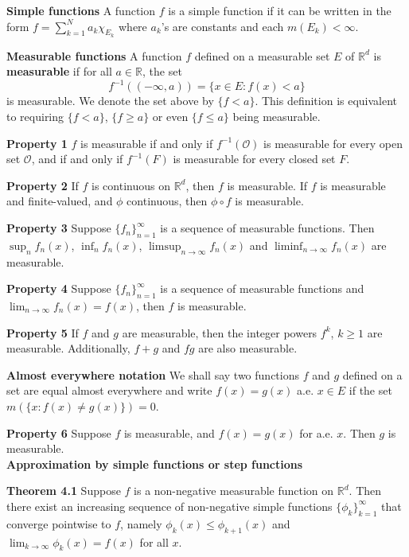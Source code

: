 \documentclass[6pt,landscape]{article}
\begin{document}
\begin{multicols*}{3}
\textbf{Simple functions} A function $f$ is a simple function if it can be written in the form $f = \sum_{k=1}^N a_k\chi_{E_k}$ where $a_k$'s are constants and each $m(E_k)<\infty$.

\textbf{Measurable functions} A function $f$ defined on a measurable set $E$ of $\mathbb{R}^d$ is \textbf{measurable} if for all $a\in\mathbb{R}$, the set
\[ f^{-1}((-\infty,a)) = \{x\in E: f(x) < a\} \]
is measurable. We denote the set above by $\{f < a\}$. This definition is equivalent to requiring $\{f < a\}$, $\{f\geq a\}$ or even $\{f\leq a\}$ being measurable.

\textbf{Property 1} $f$ is measurable if and only if $f^{-1}(\mathcal{O})$ is measurable for every open set $\mathcal{O}$, and if and only if $f^{-1}(F)$ is measurable for every closed
set $F$.

\textbf{Property 2} If $f$ is continuous on $\mathbb{R}^d$, then $f$ is measurable. If $f$ is measurable and finite-valued, and $\phi$ continuous, then $\phi\circ f$ is measurable.

\textbf{Property 3} Suppose $\{f_n\}_{n=1}^{\infty}$ is a sequence of measurable functions. Then $\sup_n f_n(x)$, $\inf_n f_n(x)$, $\limsup_{n\to\infty} f_n(x)$ and
$\liminf_{n\to\infty} f_n(x)$ are measurable.

\textbf{Property 4} Suppose $\{f_n\}_{n=1}^{\infty}$ is a sequence of measurable functions and $\lim_{n\to\infty} f_n(x) = f(x)$, then $f$ is measurable.

\textbf{Property 5} If $f$ and $g$ are measurable, then the integer powers $f^k$, $k\geq 1$ are measurable. Additionally, $f+g$ and $fg$ are also measurable.

\textbf{Almost everywhere notation} We shall say two functions $f$ and $g$ defined on a set are equal almost everywhere and write $f(x)=g(x)$ a.e. $x\in E$ if the set
$m(\{x: f(x)\neq g(x)\}) = 0$.

\textbf{Property 6} Suppose $f$ is measurable, and $f(x)=g(x)$ for a.e. $x$. Then $g$ is measurable.\\

\textbf{Approximation by simple functions or step functions}

\textbf{Theorem 4.1} Suppose $f$ is a non-negative measurable function on $\mathbb{R}^d$. Then there exist an increasing sequence of non-negative simple functions 
$\{\phi_k\}_{k=1}^{\infty}$  that converge pointwise to $f$, namely $\phi_k(x) \leq \phi_{k+1}(x)$ and $\lim_{k\to\infty} \phi_k(x) = f(x)$ for all $x$.


\end{multicols*}
\end{document}

